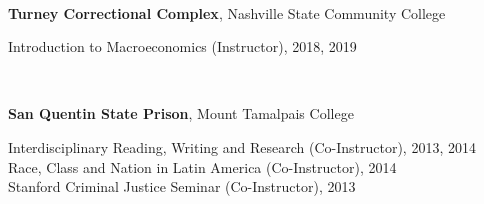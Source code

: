 \documentclass[11pt]{article}
\begin{document}
\vspace{.20in}
\begin{minipage}[t]{.21\textwidth}
	\flushright
	\so{ }\hspace*{.2in} \\
\end{minipage}
\begin{minipage}[t]{.79\textwidth}













			\textbf{Turney Correctional Complex}, Nashville State Community College \\
			\vspace{-.14in}

			\hspace*{.1in} Introduction to Macroeconomics (Instructor),    2018, 2019\\


\end{minipage}
			\begin{minipage}[t]{.21\textwidth}
				\so{ } \\
			\end{minipage}
			\begin{minipage}[t]{.79\textwidth}
		\vspace{.11in}
		\textbf{San Quentin State Prison}, Mount Tamalpais College \\
		\vspace{-.13in}

			\hspace*{.1in} Interdisciplinary Reading, Writing and Research (Co-Instructor),  2013, 2014 \\
			\hspace*{.1in} Race, Class and Nation in Latin America (Co-Instructor),  2014 \\
			\hspace*{.1in} Stanford Criminal Justice Seminar (Co-Instructor),  2013 \\

\end{minipage}
\end{document}
